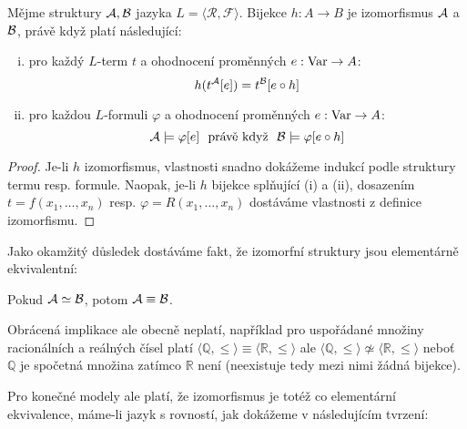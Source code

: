 \begin{proposition}
Mějme struktury $\mathcal{A},\mathcal{B}$ jazyka $L=\langle\mathcal R,\mathcal F\rangle$. Bijekce $h\colon A\to B$ je izomorfismus $\mathcal{A}$ a $\mathcal{B}$, právě když platí následující:
\begin{enumerate}[(i)]
    \item pro každý $L$-term $t$ a ohodnocení proměnných $e:\operatorname{Var}\to A$:
    $$
    h(t^{\mathcal{A}}[e])=t^{\mathcal{B}}[e\circ h]
    $$
    \item pro každou $L$-formuli $\varphi$ a ohodnocení proměnných $e:\operatorname{Var}\to A$:
    $$
    \A\models \varphi[e]\ \text{ právě když }\ \B\models\varphi[e\circ h]
    $$
\end{enumerate}
\end{proposition}
\begin{proof}
    Je-li $h$ izomorfismus, vlastnosti snadno dokážeme indukcí podle struktury termu resp. formule. Naopak, je-li $h$ bijekce splňující (i) a (ii), dosazením $t=f(x_1,\dots,x_n)$ resp. $\varphi=R(x_1,\dots,x_n)$ dostáváme vlastnosti z definice izomorfismu.
\end{proof}

Jako okamžitý důsledek dostáváme fakt, že izomorfní struktury jsou elementárně ekvivalentní:

\begin{corollary}\label{corollary:isomorphic-implies-elementarily-equivalent}
    Pokud $\mathcal{A}\simeq\mathcal{B}$, potom $\mathcal{A}\equiv\mathcal{B}$.
\end{corollary}

\begin{remark}
    Obrácená implikace ale obecně neplatí, například pro uspořádané množiny racionálních a reálných čísel platí $\langle\mathbb Q,\leq \rangle\equiv\langle\mathbb R,\leq\rangle$ ale $\langle\mathbb Q,\leq \rangle\not\simeq \langle \mathbb R,\leq\rangle$ neboť $\mathbb Q$ je spočetná množina zatímco $\mathbb R$ není (neexistuje tedy mezi nimi žádná bijekce).
\end{remark}

Pro konečné modely ale platí, že izomorfismus je totéž co elementární ekvivalence, máme-li jazyk s rovností, jak dokážeme v následujícím tvrzení:

